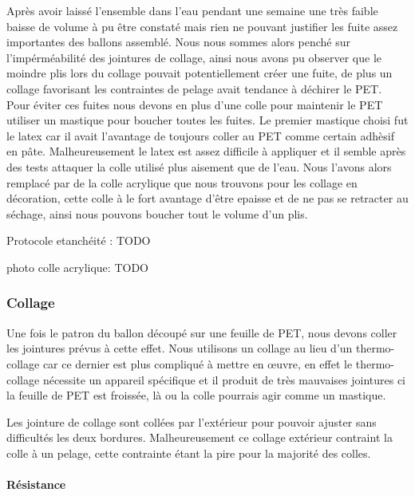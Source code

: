 \documentclass[a4paper,11pt]{article}
\begin{document}
Après avoir laissé l'ensemble dans l'eau pendant une semaine une très faible baisse de volume à pu être constaté mais rien ne pouvant justifier les fuite assez importantes des ballons assemblé. Nous nous sommes alors penché sur l'impérméabilité des jointures de collage, ainsi nous avons pu observer que le moindre plis lors du collage pouvait potentiellement créer une fuite, de plus un collage favorisant les contraintes de pelage avait tendance à déchirer le PET. Pour éviter ces fuites nous devons en plus d'une colle pour maintenir le PET utiliser un mastique pour boucher toutes les fuites. Le premier mastique choisi fut le latex car il avait l'avantage de toujours coller au PET comme certain adhèsif en pâte. Malheureusement le latex est assez difficile à appliquer et il semble après des tests attaquer la colle utilisé plus aisement que de l'eau. Nous l'avons alors remplacé par de la colle acrylique que nous trouvons pour les collage en décoration, cette colle à le fort avantage d'être epaisse et de ne pas se retracter au séchage, ainsi nous pouvons boucher tout le volume d'un plis.

Protocole etanchéité : TODO


photo colle acrylique: TODO


\subsubsection{Collage}

Une fois le patron du ballon découpé sur une feuille de PET, nous devons coller les jointures prévus à cette effet. Nous utilisons un collage au lieu d'un thermo-collage car ce dernier est plus compliqué à mettre en œuvre, en effet le thermo-collage nécessite un appareil spécifique et il produit de très mauvaises jointures ci la feuille de PET est froissée, là ou la colle pourrais agir comme un mastique.




Les jointure de collage sont collées par l'extérieur pour pouvoir ajuster sans difficultés les deux bordures. Malheureusement ce collage extérieur contraint la colle à un pelage, cette contrainte étant la pire pour la majorité des colles.

\paragraph{Résistance}
\end{document}
